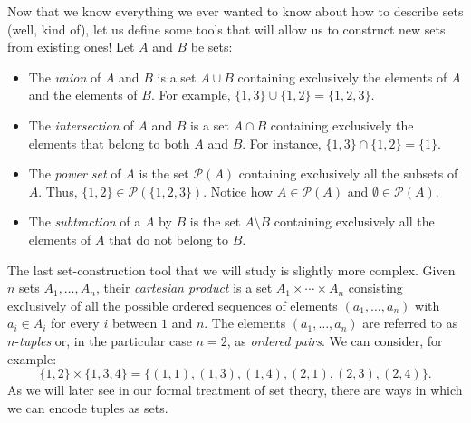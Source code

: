 \begin{para}
Now that we know everything we ever wanted to know about how to describe sets (well, kind of), let us define some tools that will allow us to construct new sets from existing ones! Let $A$ and $B$ be sets:

\begin{itemize}
\item The \emph{union} of $A$ and $B$ is a set $A\cup B$ containing exclusively the elements of $A$ and the elements of $B$. 
For example, $\{1,3\} \cup \{1,2\} = \{1,2,3\}$.
\item The \emph{intersection} of $A$ and $B$ is a set $A\cap B$ containing exclusively the elements that belong to both $A$ and $B$.
For instance, $\{1,3\} \cap \{1,2\} = \{1\}$.
\item The \emph{power set} of $A$ is the set $\mathcal{P}(A)$ containing exclusively all the subsets of $A$. Thus, $\{1,2\}\in\mathcal{P}(\{1,2,3\})$. Notice how $A \in \mathcal{P}(A)$ and $\emptyset \in \mathcal{P}(A)$.
\item The \emph{subtraction} of a $A$ by $B$ is the set $A\setminus B$ containing exclusively all the elements of $A$ that do not belong to $B$.
\end{itemize}

The last set-construction tool that we will study is slightly more complex. Given $n$ sets $A_1,\ldots,A_n$, their \emph{cartesian product} is a set $A_1\times\cdots\times A_n$ consisting exclusively of all the possible ordered sequences of elements $(a_1,\ldots,a_n)$ with $a_i \in A_i$ for every $i$ between $1$ and $n$. The elements $(a_1,\ldots,a_n)$ are referred to as $n$-\emph{tuples} or, in the particular case $n=2$, as \emph{ordered pairs}. 
We can consider, for example:
\[ \{1,2\} \times \{1,3,4\} = \{(1,1),(1,3),(1,4),(2,1),(2,3),(2,4)\}.\]
As we will later see in our formal treatment of set theory, there are ways in which we can encode tuples as sets.
\end{para}

